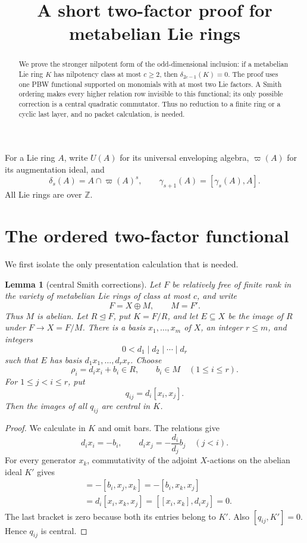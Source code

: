 \documentclass[11pt]{amsart}
\title{A short two-factor proof for metabelian Lie rings}
\author{}
\date{}
\newtheorem{lemma}[theorem]{Lemma}
\theoremstyle{remark}
\newcommand{\Z}{\mathbb Z}
\newcommand{\aug}{\varpi}
\newcommand{\gm}{\gamma}
\begin{document}
\begin{abstract}
We prove the stronger nilpotent form of the odd-dimensional inclusion:
if a metabelian Lie ring $K$ has nilpotency class at most $c\geq2$, then
$\delta_{2c-1}(K)=0$.  The proof uses one PBW functional supported on
monomials with at most two Lie factors.  A Smith ordering makes every
higher relation row invisible to this functional; its only possible
correction is a central quadratic commutator.  Thus no reduction to a
finite ring or a cyclic last layer, and no packet calculation, is needed.
\end{abstract}

\maketitle

For a Lie ring $A$, write $U(A)$ for its universal enveloping algebra,
$\aug(A)$ for its augmentation ideal, and
\[
  \delta_s(A)=A\cap\aug(A)^s,
  \qquad \gm_{s+1}(A)=[\gm_s(A),A].
\]
All Lie rings are over $\Z$.

\section{The ordered two-factor functional}

We first isolate the only presentation calculation that is needed.

\begin{lemma}[central Smith corrections]\label{lem:central}
Let $F$ be relatively free of finite rank in the variety of metabelian
Lie rings of class at most $c$, and write
\[
                         F=X\oplus M,\qquad M=F'.
\]
Thus $M$ is abelian.  Let $R\mathrel{\unlhd}F$, put $K=F/R$, and let
$E\subseteq X$ be the image of $R$ under $F\to X=F/M$.  There is a
basis $x_1,\ldots,x_m$ of $X$, an integer $r\leq m$, and integers
\[
                    0<d_1\mid d_2\mid\cdots\mid d_r
\]
such that $E$ has basis $d_1x_1,\ldots,d_rx_r$.  Choose
\[
                  \rho_i=d_ix_i+b_i\in R,
                  \qquad b_i\in M\quad(1\leq i\leq r).
\]
For $1\leq j<i\leq r$, put
\[
                         q_{ij}=d_i[x_i,x_j].
\]
Then the images of all $q_{ij}$ are central in $K$.
\end{lemma}

\begin{proof}
We calculate in $K$ and omit bars.  The relations give
\[
        d_ix_i=-b_i,
        \qquad d_ix_j=-\frac{d_i}{d_j}b_j\quad(j<i).
\]
For every generator $x_k$, commutativity of the adjoint $X$-actions
on the abelian ideal $K'$ gives
\begin{align*}
 [q_{ij},x_k]
 &=-[b_i,x_j,x_k]
  =-[b_i,x_k,x_j]                                      \\
 &=d_i[x_i,x_k,x_j]
  =[[x_i,x_k],d_ix_j]=0.
\end{align*}
The last bracket is zero because both its entries belong to $K'$.
Also $[q_{ij},K']=0$.  Hence $q_{ij}$ is central.
\end{proof}
\end{document}
